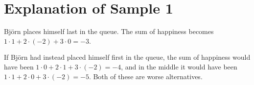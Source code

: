 \section*{Explanation of Sample 1}

Björn places himself last in the queue. The sum of happiness becomes $1 \cdot 1 + 2\cdot(-2) + 3 \cdot 0 = -3$.

If Björn had instead placed himself first in the queue, the sum of happiness would have been $1 \cdot 0 + 2 \cdot 1 + 3 \cdot (-2) = -4$, and in the middle it would have been $1 \cdot 1 + 2 \cdot 0 + 3 \cdot (-2) = -5$. Both of these are worse alternatives.
